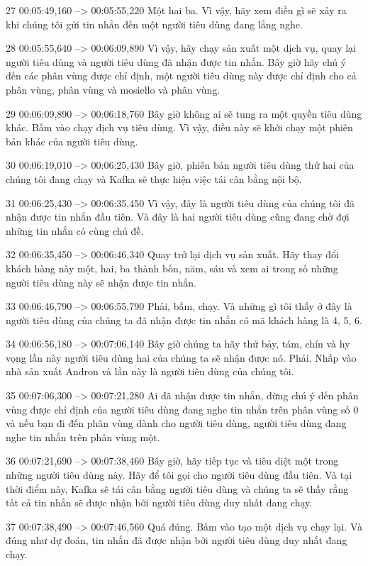 27
00:05:49,160 --> 00:05:55,220
Một hai ba.  Vì vậy, hãy xem điều gì sẽ xảy ra khi chúng tôi gửi tin nhắn đến một người tiêu dùng đang lắng nghe.

28
00:05:55,640 --> 00:06:09,890
Vì vậy, hãy chạy sản xuất một dịch vụ, quay lại người tiêu dùng và người tiêu dùng đã nhận được tin nhắn.  Bây giờ hãy chú ý đến các phân vùng được chỉ định, một người tiêu dùng này được chỉ định cho cả phân vùng, phân vùng và mosiello và phân vùng.

29
00:06:09,890 --> 00:06:18,760
Bây giờ không ai sẽ tung ra một quyền tiêu dùng khác.  Bấm vào chạy dịch vụ tiêu dùng.  Vì vậy, điều này sẽ khởi chạy một phiên bản khác của người tiêu dùng.

30
00:06:19,010 --> 00:06:25,430
Bây giờ, phiên bản người tiêu dùng thứ hai của chúng tôi đang chạy và Kafka sẽ thực hiện việc tái cân bằng nội bộ.

31
00:06:25,430 --> 00:06:35,450
Vì vậy, đây là người tiêu dùng của chúng tôi đã nhận được tin nhắn đầu tiên.  Và đây là hai người tiêu dùng cũng đang chờ đợi những tin nhắn có cùng chủ đề.

32
00:06:35,450 --> 00:06:46,340
Quay trở lại dịch vụ sản xuất.  Hãy thay đổi khách hàng này một, hai, ba thành bốn, năm, sáu và xem ai trong số những người tiêu dùng này sẽ nhận được tin nhắn.

33
00:06:46,790 --> 00:06:55,790
Phải, bấm, chạy.  Và những gì tôi thấy ở đây là người tiêu dùng của chúng ta đã nhận được tin nhắn có mã khách hàng là 4, 5, 6.

34
00:06:56,180 --> 00:07:06,140
Bây giờ chúng ta hãy thử bảy, tám, chín và hy vọng lần này người tiêu dùng hai của chúng ta sẽ nhận được nó.  Phải.  Nhấp vào nhà sản xuất Andron và lần này là người tiêu dùng của chúng tôi.

35
00:07:06,300 --> 00:07:21,280
Ai đã nhận được tin nhắn, đừng chú ý đến phân vùng được chỉ định của người tiêu dùng đang nghe tin nhắn trên phân vùng số 0 và nếu bạn đi đến phân vùng dành cho người tiêu dùng, người tiêu dùng đang nghe tin nhắn trên phân vùng một.

36
00:07:21,690 --> 00:07:38,460
Bây giờ, hãy tiếp tục và tiêu diệt một trong những người tiêu dùng này.  Hãy để tôi gọi cho người tiêu dùng đầu tiên.  Và tại thời điểm này, Kafka sẽ tái cân bằng người tiêu dùng và chúng ta sẽ thấy rằng tất cả tin nhắn sẽ được nhận bởi người tiêu dùng duy nhất đang chạy.

37
00:07:38,490 --> 00:07:46,560
Quá đúng.  Bấm vào tạo một dịch vụ chạy lại.  Và đúng như dự đoán, tin nhắn đã được nhận bởi người tiêu dùng duy nhất đang chạy.

